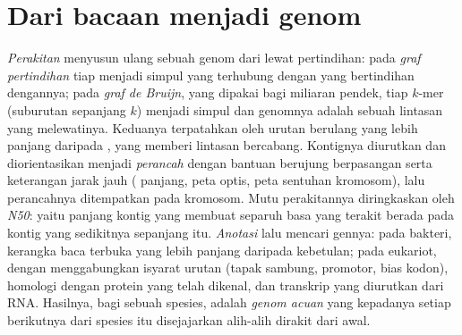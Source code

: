 \section{Dari bacaan menjadi genom}

\begin{definition}\label{def:b3:genomics:assembly}
\emph{Perakitan} menyusun ulang sebuah genom dari  lewat
pertindihan: pada \emph{graf pertindihan} tiap  menjadi simpul yang
terhubung dengan  yang bertindihan dengannya; pada \emph{graf de Bruijn},
yang dipakai bagi miliaran  pendek, tiap $k$-mer (suburutan sepanjang
$k$) menjadi simpul dan genomnya adalah sebuah lintasan yang melewatinya.
Keduanya terpatahkan oleh urutan berulang yang lebih panjang daripada
, yang memberi lintasan bercabang. Kontignya diurutkan dan
diorientasikan menjadi \emph{perancah} dengan bantuan  berujung
berpasangan serta keterangan jarak jauh ( panjang, peta optis, peta
sentuhan kromosom), lalu perancahnya ditempatkan pada kromosom. Mutu
perakitannya diringkaskan oleh \emph{N50}: yaitu panjang kontig yang membuat
separuh basa yang terakit berada pada kontig yang sedikitnya sepanjang itu.
\emph{Anotasi} lalu mencari gennya: pada bakteri, kerangka baca terbuka yang
lebih panjang daripada kebetulan; pada eukariot, dengan menggabungkan isyarat
urutan (tapak sambung, promotor, bias kodon), homologi dengan protein yang
telah dikenal, dan transkrip yang diurutkan dari RNA. Hasilnya, bagi sebuah
spesies, adalah \emph{genom acuan} yang kepadanya setiap  berikutnya
dari spesies itu disejajarkan alih-alih dirakit dari awal.
\end{definition}

